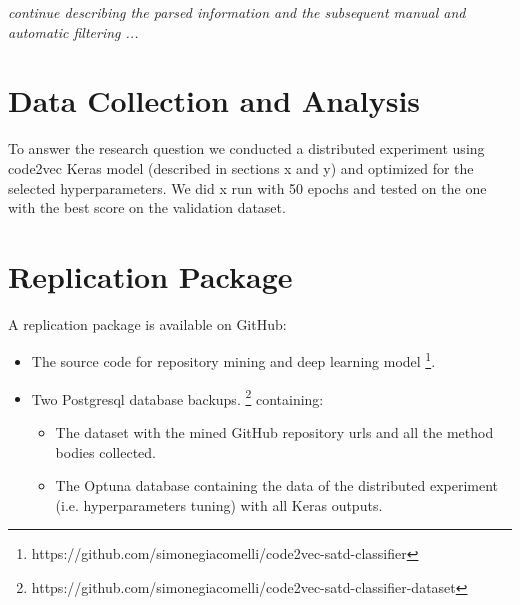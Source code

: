 \emph{continue describing the parsed information and the subsequent manual and automatic filtering ...}

\section{Data Collection and Analysis}



To answer the research question we conducted a distributed experiment using code2vec Keras model (described in sections x and y) and optimized for the selected hyperparameters. We did x run with 50 epochs and tested on the one with the best score on the validation dataset. 



\section{Replication Package}
A replication package is available on GitHub:
\begin{itemize}
    \item The source code for repository mining and deep learning model \footnote{https://github.com/simonegiacomelli/code2vec-satd-classifier}. 
    \item Two Postgresql database backups. \footnote{https://github.com/simonegiacomelli/code2vec-satd-classifier-dataset } containing:
    \begin{itemize}
\item The dataset with the mined GitHub repository urls and all the method bodies collected.
\item The Optuna database containing the data of the distributed experiment (i.e. hyperparameters tuning) with all Keras outputs. 
\end{itemize}
\end{itemize}
